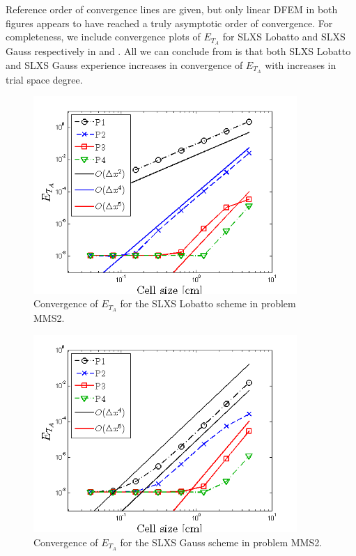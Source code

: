 Reference order of convergence lines are given, but only linear DFEM in both figures appears to have reached a truly asymptotic order of convergence.
For completeness, we include convergence plots of $E_{T_A}$ for SLXS Lobatto and SLXS Gauss respectively in  and .
All we can conclude from  is that both SLXS Lobatto and SLXS Gauss experience increases in convergence of $E_{T_A}$ with increases in trial space degree.
\begin{figure}[!htp]
\centering
\includegraphics[width=10cm]{chapter6_grey_radtran/Dissertation_Data/MMS3_SLXS_Initial_SLXS_Lobatto_temp_A.png}
\caption{Convergence of $E_{T_A}$ for the SLXS Lobatto scheme in problem MMS2.}
\label{fig:mms3_slxs_lobatto_t_a}
\end{figure}
%
%
\begin{figure}[!hbp]
\centering
\includegraphics[width=10cm]{chapter6_grey_radtran/Dissertation_Data/MMS3_SLXS_Initial_SLXS_Gauss_temp_A.png}
\caption{Convergence of $E_{T_A}$ for the SLXS Gauss scheme in problem MMS2.}
\label{fig:mms3_slxs_gauss_t_a}
\end{figure}

